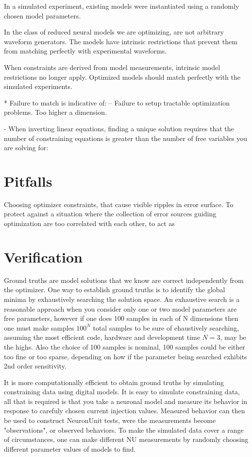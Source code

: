 In a simulated experiment, existing models were instantiated using a randomly chosen model parameters.

In the class of reduced neural models we are optimizing, are not arbitrary waveform generators. The models have intrinsic restrictions that prevent them from matching perfectly with experimental waveforms.

When constraints are derived from model measurements, intrinsic model restrictions no longer apply. Optimized models should match perfectly with the simulated experiments. 

* Failure to match is indicative of: -- Failure to setup tractable optimization problems. Too higher a dimension.

- When inverting linear equations, finding a unique solution requires that the number of constraining equations is greater than the number of free variables you are solving for:

\section{Pitfalls}
Choosing optimizer constraints, that cause visible ripples in error surface.
To protect against a situation where the collection of error sources guiding optimization are too correlated with each other, to act as 


\section{Verification}
Ground truths are model solutions that we know are correct independently from the optimizer. One way to establish ground truths is to identify the global minima by exhaustively searching the solution space. An exhaustive search is a reasonable approach when you consider only one or two model parameters are free parameters, however if one does 100 samples in each of N dimensions then one must make samples $100^{N}$ total samples to be sure of ehaustively searching, assuming the most efficient code, hardware and development time $N=3$, may be the highs.  Also the choice of 100 samples is nominal, 100 samples could be either too fine or too sparse, depending on how if the parameter being searched exhibits 2nd order sensitivity.

It is more computationally efficient to obtain ground truths by simulating constraining data using digital models. It is easy to simulate constraining data, all that is required is that you take a neuronal model and measure its behavior in response to carefuly chosen current injection values. Measured behavior can then be used to construct NeuronUnit tests, were the measurements become "observations", or observed behaviors. To make the simulated data cover a range of circumstances, one can make different NU measurements by randomly choosing different parameter values of models to find.

